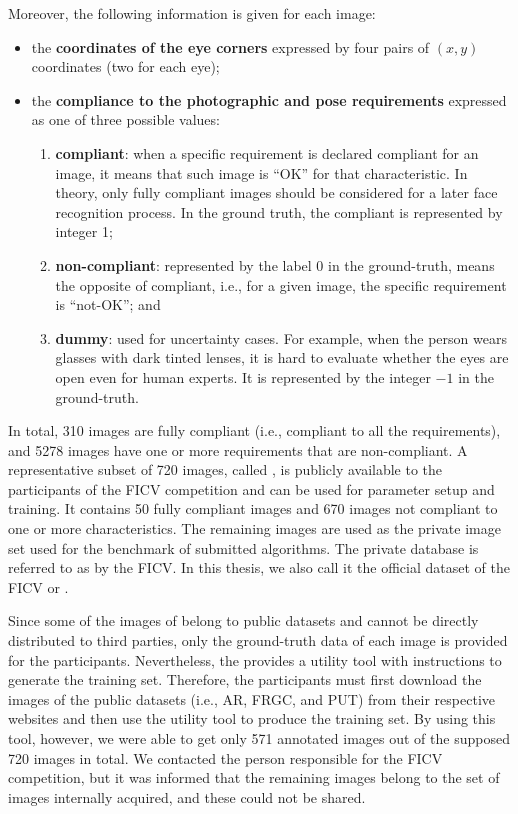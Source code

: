 Moreover, the following information is given for each image:

\begin{itemize}
\item the \textbf{coordinates of the eye corners} expressed by four pairs of $(x, y)$ coordinates (two for each eye);
\item the \textbf{compliance to the photographic and pose requirements} expressed as one of three possible values:     
    \begin{enumerate}[i]
    \item \textbf{compliant}: when a specific requirement is declared compliant for an image, it means that such image is ``OK'' for that characteristic. In theory, only fully compliant images should be considered for a later face recognition process. In the ground truth, the compliant is represented by integer 1;
    \item \textbf{non-compliant}: represented by the label 0 in the ground-truth, means the opposite of compliant, i.e., for a given image, the specific requirement is ``not-OK''; and
    \item \textbf{dummy}: used for uncertainty cases. For example, when the person wears glasses with dark tinted lenses, it is hard to evaluate whether the eyes are open even for human experts. It is represented by the integer $-1$ in the ground-truth.
    \end{enumerate}
\end{itemize}

In total, 310 images are fully compliant (i.e., compliant to all the requirements), and 5278 images have one or more requirements that are non-compliant. A representative subset of 720 images, called \ficvtest, is publicly available to the participants of the FICV competition and can be used for parameter setup and training. It contains 50 fully compliant images and 670 images not compliant to one or more characteristics. The remaining images are used as the private image set used for the benchmark of submitted algorithms. The private database is referred to as \ficvofficial by the FICV. In this thesis, we also call it the official dataset of the FICV or \fvcongoing. 

Since some of the images of \ficvtest belong to public datasets and cannot be directly distributed to third parties, only the ground-truth data of each image is provided for the participants. Nevertheless, the \fvcongoing provides a utility tool with instructions to generate the training set. Therefore, the participants must first download the images of the public datasets (i.e., AR, FRGC, and PUT) from their respective websites and then use the utility tool to produce the training set. By using this tool, however, we were able to get only 571 annotated images out of the supposed 720 images in total. We contacted the person responsible for the FICV competition, but it was informed that the remaining images belong to the set of images internally acquired, and these could not be shared.

